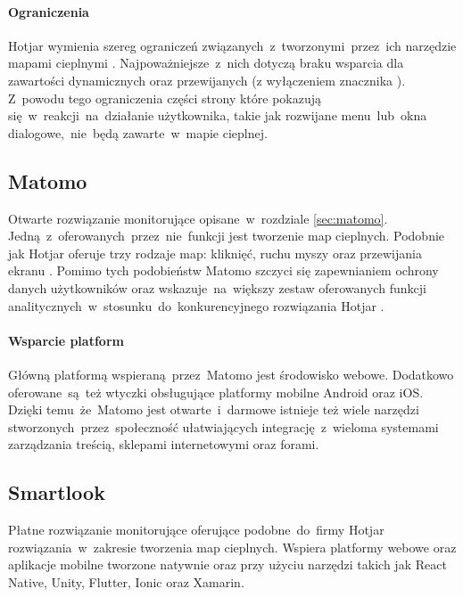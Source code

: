 \paragraph{Ograniczenia} 
Hotjar wymienia szereg ograniczeń związanych~z~tworzonymi~przez~ich narzędzie mapami cieplnymi \cite{Hotjar_limitations}. Najpoważniejsze~z~nich dotyczą braku wsparcia dla zawartości dynamicznych oraz przewijanych (z wyłączeniem znacznika ). Z~powodu tego ograniczenia części strony które pokazują się~w~reakcji~na~działanie użytkownika, takie jak rozwijane menu~lub~okna dialogowe,~nie~będą zawarte~w~mapie cieplnej.

\subsection{Matomo}
Otwarte rozwiązanie monitorujące opisane~w~rozdziale \ref{sec:matomo}. Jedną~z~oferowanych~przez~nie~funkcji jest tworzenie map cieplnych. Podobnie jak Hotjar oferuje trzy rodzaje map: kliknięć, ruchu myszy oraz przewijania ekranu \cite{Matomo_heatmaps}. Pomimo tych podobieństw Matomo szczyci się zapewnianiem ochrony danych użytkowników oraz wskazuje~na~większy zestaw oferowanych funkcji analitycznych~w~stosunku~do~konkurencyjnego rozwiązania Hotjar \cite{Matomo_hotjar}.

\paragraph{Wsparcie platform} 
Główną platformą wspieraną~przez~Matomo jest środowisko webowe. Dodatkowo oferowane~są~też wtyczki obsługujące platformy mobilne Android oraz iOS. Dzięki temu~że~Matomo jest otwarte~i~darmowe istnieje też wiele narzędzi stworzonych~przez~społeczność ułatwiających integrację~z~wieloma systemami zarządzania treścią, sklepami internetowymi oraz forami.

\subsection{Smartlook}
Płatne rozwiązanie monitorujące oferujące podobne~do~firmy Hotjar rozwiązania~w~zakresie tworzenia map cieplnych. Wspiera platformy webowe oraz aplikacje mobilne tworzone natywnie oraz przy użyciu narzędzi takich jak React Native, Unity, Flutter, Ionic oraz Xamarin.
